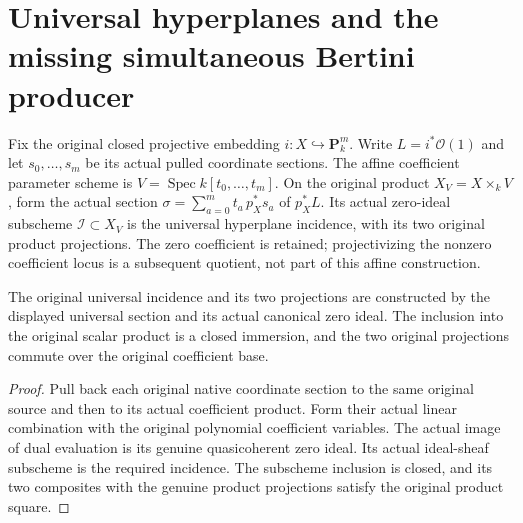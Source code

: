 \section{Universal hyperplanes and the missing simultaneous Bertini producer}

Fix the original closed projective embedding $i:X\hookrightarrow\mathbf P^m_k$.
Write $L=i^*\mathcal O(1)$ and let $s_0,\ldots,s_m$ be its actual pulled
coordinate sections.  The affine coefficient parameter scheme is
$V=\operatorname{Spec}k[t_0,\ldots,t_m]$.  On the original product
$X_V=X\times_k V$, form the actual section
$\sigma=\sum_{a=0}^m t_a\,p_X^*s_a$ of $p_X^*L$.
Its actual zero-ideal subscheme $\mathcal I\subset X_V$ is the universal
hyperplane incidence, with its two original product projections.
The zero coefficient is retained; projectivizing the nonzero coefficient
locus is a subsequent quotient, not part of this affine construction.

\begin{definition}
\label{def:kn-nadel-bertini-universal-incidence}
\leanok
The original universal incidence and its two projections are constructed by
the displayed universal section and its actual canonical zero ideal.
The inclusion into the original scalar product is a closed immersion, and
the two original projections commute over the original coefficient base.
\end{definition}
\begin{proof}
Pull back each original native coordinate section to the same original
source and then to its actual coefficient product. Form their actual
linear combination with the original polynomial coefficient variables.
The actual image of dual evaluation is its genuine quasicoherent zero
ideal. Its actual ideal-sheaf subscheme is the required incidence. The
subscheme inclusion is closed, and its two composites with the genuine
product projections satisfy the original product square.
\end{proof}


